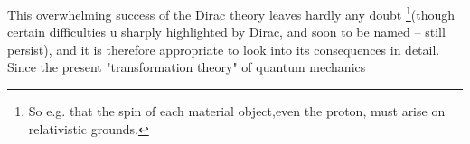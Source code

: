 \begin{paper}{1}
This overwhelming success of the Dirac theory leaves hardly any doubt \footnote{So e.g. that the spin of each material object,even the proton, must arise on relativistic grounds.}(though certain difficulties   u   sharply highlighted by Dirac, and soon to be named -- still persist), and it is therefore appropriate to look into its consequences in detail. Since the present "transformation theory" of quantum mechanics 

\end{paper}